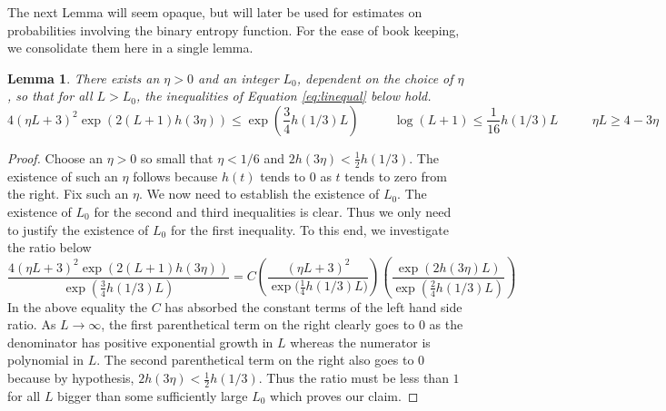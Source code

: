 \documentclass[11pt,a4paper]{amsart}
\newtheorem{lemma}[theorem]{Lemma}
\theoremstyle{definition}
\theoremstyle{remark}
\begin{document}
The next Lemma will seem opaque, but will later be used for estimates on probabilities involving the binary entropy function.  For the ease of book keeping, we consolidate them here in a single lemma.   
\begin{lemma}\label{lem:binent}
There exists an $\eta > 0$ and an integer $L_{0}$, dependent on the choice of $\eta$, so that for all $L > L_{0}$, the inequalities of Equation \ref{eq:linequal} below hold. 
\begin{equation}\label{eq:linequal}
4\left(\eta L + 3\right)^{2}\exp\left(2(L+1)h(3\eta)\right) \leq \exp\left(\frac{3}{4}h(1/3)L\right) \phantom{==} \log(L+1) \leq \frac{1}{16}h(1/3)L \phantom{==} \eta L \geq 4-3\eta
\end{equation} 
\end{lemma}

\begin{proof}
Choose an $\eta > 0$ so small that $\eta < 1/6$ and $2h(3\eta) < \frac{1}{2}h(1/3)$.  The existence of such an $\eta$ follows because $h(t)$ tends to $0$ as $t$ tends to zero from the right.  Fix such an $\eta$.  We now need to establish the existence of $L_{0}$.  The existence of $L_{0}$ for the second and third inequalities is clear.  Thus we only need to justify the existence of $L_{0}$ for the first inequality.  To this end, we investigate the ratio below
\begin{equation*}
\frac{4(\eta L + 3)^{2}\exp\left(2(L+1)h(3\eta)\right)}{\exp\left(\frac{3}{4}h(1/3)L\right)} = C\left(\frac{(\eta L+3)^{2}}{\exp({\frac{1}{4}h(1/3)L)}}\right)\left(\frac{\exp(2h(3\eta)L)}{\exp{(\frac{2}{4}h(1/3)L)}}\right)
\end{equation*} 
In the above equality the $C$ has absorbed the constant terms of the left hand side ratio.  As $L \to \infty$, the first parenthetical term on the right clearly goes to $0$ as the denominator has positive exponential growth in $L$ whereas the numerator is polynomial in $L$.  The second parenthetical term on the right also goes to $0$ because by hypothesis, $2h(3\eta) < \frac{1}{2}h(1/3)$.  Thus the ratio must be less than $1$ for all $L$ bigger than some sufficiently large $L_{0}$ which proves our claim.   
\end{proof}
\end{document}
